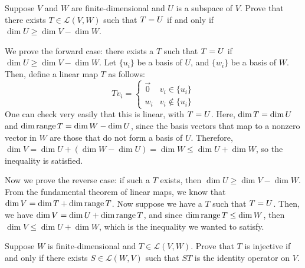 \documentclass[10pt]{article}
\begin{document}
	\begin{problem}
		Suppose \( V \) and \( W \) are finite-dimensional and \( U \) is a subspace of \( V \). Prove that 
		there exists \( T \in \mathcal L(V, W) \) such that \( \null T = U \) if and only if 
		\( \dim U \ge  \dim V - \dim W \). 
	\end{problem}
	

	\begin{solution}
		We prove the forward case: there exists a \( T \) such that \( \null T = U \) if 
		\( \dim U \ge \dim V - \dim W \). Let \( \{u_i \} \) be a basis of \( U \), and \( \{ w_i \} \) be a basis 
		of \( W \). Then, define a linear map \( T \) as follows:
		\[
		Tv_i = \begin{cases}
			\vec 0 & v_i \in \{u_i\} \\
			w_i & v_i \not \in \{u_i\} 
		\end{cases}
		\] 
		One can check very easily that this is linear, with \( \null T = U \). Here, \( \dim \null T = \dim U\)
		and \( \dim \operatorname*{range} T = \dim W - \dim U \), since the basis vectors that map to a nonzero vector in \( W \) 
		are those that do not form a basis of \( U \). Therefore, \( \dim V = \dim U + (\dim W - \dim U) = \dim W
		\le \dim U + \dim W\), so the inequality is satisfied. 


		Now we prove the reverse case: if such a \( T \) exists, then \( \dim U \ge \dim V - \dim W \). 
		From the fundamental theorem of linear maps, we know that 
		\( \dim V = \dim \null T + \dim \range T \). Now suppose we have a \( T \) such that \( \null T = U \). 
		Then, we have \( \dim V = \dim U + \dim \operatorname*{range} T \), and since \( \dim \operatorname*{range} T \le \dim W \), then 
		\( \dim V \le  \dim U + \dim W  \), which is the inequality we wanted to satisfy. 
	\end{solution}

	\begin{problem}
		Suppose \( W \) is finite-dimensional and \( T \in \mathcal L(V, W) \). Prove that \( T \) is 
		injective if and only if there exists \( S \in \mathcal L(W, V)  \) such that \( ST \) is the identity 
		operator on \( V \).

	\end{problem}
\end{document}
